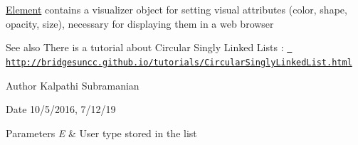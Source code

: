 \mbox{\hyperlink{classbridges_1_1datastructure_1_1_element}{Element}} contains a visualizer object for setting visual attributes (color, shape, opacity, size), necessary for displaying them in a web browser

\begin{DoxySeeAlso}{See also}
There is a tutorial about Circular Singly Linked Lists \+: \href{http://bridgesuncc.github.io/tutorials/CircularSinglyLinkedList.html}{\texttt{ http\+://bridgesuncc.\+github.\+io/tutorials/\+Circular\+Singly\+Linked\+List.\+html}}
\end{DoxySeeAlso}
\begin{DoxyAuthor}{Author}
Kalpathi Subramanian 
\end{DoxyAuthor}
\begin{DoxyDate}{Date}
10/5/2016, 7/12/19
\end{DoxyDate}

\begin{DoxyParams}{Parameters}
{\em E} & User type stored in the list \\
\hline
\end{DoxyParams}

